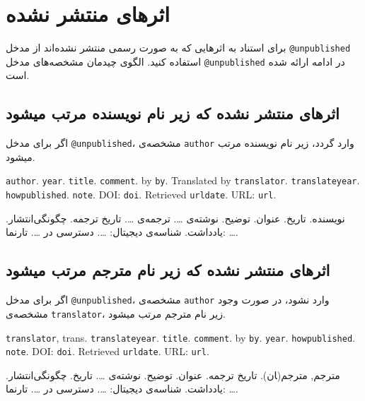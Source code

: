 \documentclass[a4paper,11pt]{article}
\begin{document}
\section{اثرهای منتشر نشده}
برای استناد به اثرهایی که به صورت رسمی منتشر نشده‌اند از مدخل \verb|@unpublished| استفاده کنید. الگوی چیدمان مشخصه‌های مدخل \verb|@unpublished| در ادامه ارائه شده است.





\subsection{اثرهای منتشر نشده که زیر نام نویسنده مرتب میشود}
اگر برای مدخل \verb|@unpublished|، مشخصه‌ی \verb|author| وارد گردد، زیر نام نویسنده مرتب میشود.

\begin{itemize}[nosep]
\begin{latin}
\item[] []
{\tt author}. {\tt year}. {\tt title}. {\tt comment}. by {\tt by}. Translated by {\tt translator}. {\tt translateyear}. {\tt howpublished}. {\tt note}. DOI: {\tt doi}. Retrieved {\tt urldate}. URL: {\tt url}. 
\end{latin}

\item[] []
{\persianttfamily نویسنده}. {\persianttfamily تاریخ}. {\persianttfamily عنوان}. {\persianttfamily توضیح}. نوشته‌ی {\persianttfamily …}. ترجمه‌ی {\persianttfamily …}. {\persianttfamily تاریخ ترجمه}. {\persianttfamily چگونگی‌انتشار}. {\persianttfamily یادداشت}. شناسه‌ی دیجیتال: {\persianttfamily …}. دسترسی در {\persianttfamily …}. تارنما: {\persianttfamily …}. 
\end{itemize}





\subsection{اثرهای منتشر نشده که زیر نام مترجم مرتب میشود}
اگر برای مدخل \verb|@unpublished|، مشخصه‌ی \verb|author| وارد نشود، در صورت وجود مشخصه‌ی \verb|translator|، زیر نام مترجم مرتب میشود.

\begin{itemize}[nosep]
\begin{latin}
\item[] []
{\tt translator}, trans. {\tt translateyear}. {\tt title}. {\tt comment}. by {\tt by}. {\tt year}. {\tt howpublished}. {\tt note}. DOI: {\tt doi}. Retrieved {\tt urldate}. URL: {\tt url}. 
\end{latin}

\item[] []
{\persianttfamily مترجم}, مترجم(‍ان). {\persianttfamily تاریخ ترجمه}. {\persianttfamily عنوان}. {\persianttfamily توضیح}. نوشته‌ی {\persianttfamily …}. {\persianttfamily تاریخ}. {\persianttfamily چگونگی‌انتشار}. {\persianttfamily یادداشت}. شناسه‌ی دیجیتال: {\persianttfamily …}. دسترسی در {\persianttfamily …}. تارنما: {\persianttfamily …}. 
\end{itemize}
\end{document}
